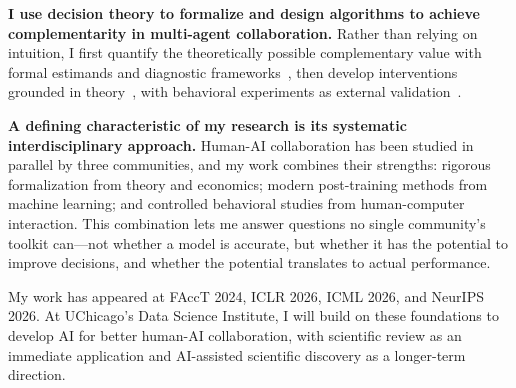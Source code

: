 \textbf{I use decision theory to formalize and design algorithms to achieve complementarity in multi-agent collaboration. } 
Rather than relying on intuition, I first quantify the theoretically possible complementary value with formal estimands and diagnostic frameworks~\cite{guo2024decision, guo2026value, guo2026explanations}, then develop interventions grounded in theory~\cite{guo2026complllm}, with behavioral experiments as external validation~\cite{guo2026value}.

\textbf{A defining characteristic of my research is its systematic interdisciplinary approach.}
Human-AI collaboration has been studied in parallel by three communities, and my work combines their strengths: rigorous formalization from theory and economics; modern post-training methods from machine learning; and controlled behavioral studies from human-computer interaction.
This combination lets me answer questions no single community's toolkit can---not whether a model is accurate, but whether it has the potential to improve decisions, and whether the potential translates to actual performance.


My work has appeared at FAccT 2024, ICLR 2026, ICML 2026, and NeurIPS 2026.
At UChicago's Data Science Institute, I will build on these foundations to develop AI for better human-AI collaboration, with scientific review as an immediate application and AI-assisted scientific discovery as a longer-term direction.
